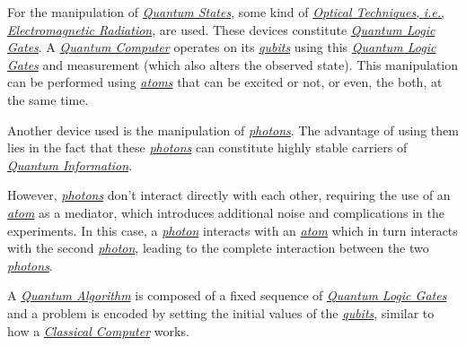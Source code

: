 \documentclass[conference]{IEEEtran}
\begin{document}
\newpage

For the manipulation of \href{https://en.wikipedia.org/wiki/Quantum_state}{\textit{Quantum States}}, some kind of \href{https://en.wikipedia.org/wiki/Electromagnetic_radiation}{\textit{Optical Techniques}, \textit{i.e.}, \textit{Electromagnetic Radiation}}, are used. These devices constitute \href{https://en.wikipedia.org/wiki/Quantum_logic_gate}{\textit{Quantum Logic Gates}}. A \href{https://en.wikipedia.org/wiki/Quantum_computing}{\textit{Quantum Computer}} operates on its \href{https://en.wikipedia.org/wiki/Qubit}{\textit{qubits}} using this \href{https://en.wikipedia.org/wiki/Quantum_logic_gate}{\textit{Quantum Logic Gates}} and measurement (which also alters the observed state). This manipulation can be performed using \href{https://en.wikipedia.org/wiki/Atom}{\textit{atoms}} that can be excited or not, or even, the both, at the same time.

\vspace{4pt}

Another device used is the manipulation of \href{https://en.wikipedia.org/wiki/Photon}{\textit{photons}}. The advantage of using them lies in the fact that these \href{https://en.wikipedia.org/wiki/Photon}{\textit{photons}} can constitute highly stable carriers of \href{https://en.wikipedia.org/wiki/Quantum_information}{\textit{Quantum Information}}.

\vspace{4pt}

However, \href{https://en.wikipedia.org/wiki/Photon}{\textit{photons}} don't interact directly with each other, requiring the use of an \href{https://en.wikipedia.org/wiki/Atom}{\textit{atom}} as a mediator, which introduces additional noise and complications in the experiments. In this case, a \href{https://en.wikipedia.org/wiki/Photon}{\textit{photon}} interacts with an \href{https://en.wikipedia.org/wiki/Atom}{\textit{atom}} which in turn interacts with the second \href{https://en.wikipedia.org/wiki/Photon}{\textit{photon}}, leading to the complete interaction between the two \href{https://en.wikipedia.org/wiki/Photon}{\textit{photons}}.

\vspace{4pt}

 A \href{https://en.wikipedia.org/wiki/Quantum_algorithm}{\textit{Quantum Algorithm}} is composed of a fixed sequence of \href{https://en.wikipedia.org/wiki/Quantum_logic_gate}{\textit{Quantum Logic Gates}} and a problem is encoded by setting the initial values of the \href{https://en.wikipedia.org/wiki/Qubit}{\textit{qubits}}, similar to how a \href{https://en.wikipedia.org/wiki/Von_Neumann_architecture}{\textit{Classical Computer}} works.
 
\end{document}
